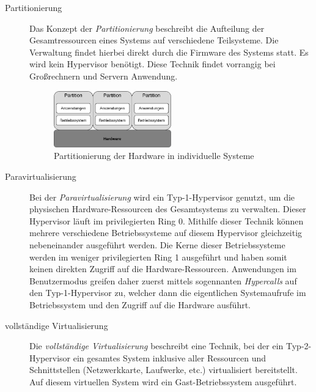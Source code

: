 \begin{description}
    \item[Partitionierung]
        Das Konzept der \textit{Partitionierung} beschreibt die Aufteilung der
        Gesamtressourcen eines Systems auf verschiedene
        Teilsysteme\cite{BSKompakt_Virt}.
        Die Verwaltung findet hierbei direkt durch die Firmware des Systems
        statt.
        Es wird kein Hypervisor benötigt.
        Diese Technik findet vorrangig bei Großrechnern und Servern Anwendung.
        \clearpage
        \begin{figure}[!htb]
            \centering
            \includegraphics[width=0.5\textwidth]{anlagen/bilder/Partitionierung}
            \caption{Partitionierung der Hardware in individuelle
            Systeme\cite{PartAbb_BSKompakt}}
            \label{fig:Partitionierung}
        \end{figure}
    \item[Paravirtualisierung]
        Bei der \textit{Paravirtualisierung} wird ein Typ-1-Hypervisor genutzt,
        um die physischen Hardware-Ressourcen des Gesamtsystems zu verwalten.
        Dieser Hypervisor läuft im privilegierten Ring 0.
        Mithilfe dieser Technik können mehrere verschiedene Betriebssysteme auf
        diesem Hypervisor gleichzeitig nebeneinander ausgeführt
        werden\cite{BSGK_RBrause}.
        Die Kerne dieser Betriebssysteme werden im weniger privilegierten Ring
        1 ausgeführt und haben somit keinen direkten Zugriff auf die
        Hardware-Ressourcen.
        Anwendungen im Benutzermodus greifen daher zuerst mittels sogennanten
        \textit{Hypercalls} auf den Typ-1-Hypervisor zu, welcher dann die
        eigentlichen Systemaufrufe im Betriebssystem und den Zugriff auf die
        Hardware ausführt\cite{BSKompakt_Virt}.
    \item[vollständige Virtualisierung]
        Die \textit{vollständige Virtualisierung} beschreibt eine Technik, bei
        der ein Typ-2-Hypervisor ein gesamtes System inklusive aller Ressourcen
        und Schnittstellen (Netzwerkkarte, Laufwerke, etc.) virtualisiert
        bereitstellt\cite{BSKompakt_Virt}.
        Auf diesem virtuellen System wird ein Gast-Betriebssystem ausgeführt.

\end{description}
